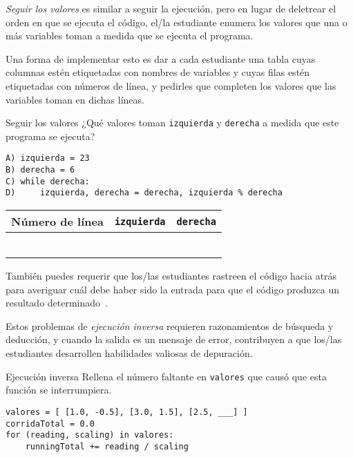 \emph{Seguir los valores} es similar a seguir la ejecución, 
pero en lugar de deletrear el orden en que se ejecuta el código, 
el/la estudiante enumera los valores que una o más variables toman
 a medida que se ejecuta el programa.

Una forma de implementar esto es dar a cada estudiante una tabla 
cuyas columnas estén etiquetadas con nombres de variables 
y cuyas filas estén etiquetadas con números de línea, 
y pedirles que completen los valores que las variables toman en dichas líneas.

\newpage
\begin{aside}{Seguir los valores}
  ¿Qué valores toman \texttt{izquierda} y \texttt{derecha} a medida que este programa se ejecuta?

\begin{verbatim}
A) izquierda = 23
B) derecha = 6
C) while derecha:
D)     izquierda, derecha = derecha, izquierda % derecha
\end{verbatim}
\end{aside}

\begin{center}
\begin{tabular}{|l|l|l|}
  \hline
  Número de línea & \texttt{izquierda} & \texttt{derecha} \\
  \hline
  & & \\
  \hline
  & & \\
  \hline
  & & \\
  \hline
  & & \\
  \hline
  & & \\
  \hline
  & & \\
  \hline
\end{tabular}
\end{center}

También puedes requerir que  los/las estudiantes rastreen el código hacia atrás para averiguar cuál debe haber sido la entrada para que el código produzca un resultado determinado~\cite{Armo2008}.


Estos problemas de  \emph{ejecución inversa} requieren razonamientos de búsqueda y deducción, 
y cuando la salida es un mensaje de error, 
contribuyen a que los/las estudiantes desarrollen habilidades valiosas de depuración.

\begin{aside}{Ejecución inversa}
  Rellena el número faltante en \texttt{valores}
  que causó que esta función se interrumpiera.

\begin{verbatim}
valores = [ [1.0, -0.5], [3.0, 1.5], [2.5, ___] ]
corridaTotal = 0.0
for (reading, scaling) in valores:
    runningTotal += reading / scaling
\end{verbatim}
\end{aside}


